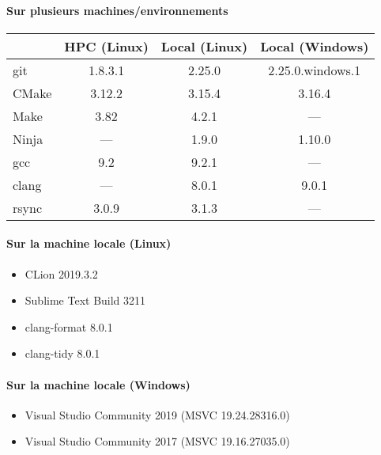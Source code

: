 \documentclass[a4paper,11pt,twoside,french,report]{../common/simplem}
\begin{document}
			\paragraph*{Sur plusieurs machines/environnements}
				\begin{center}
					\begin{tabular}{lccc}
						& HPC (Linux) & Local (Linux) & Local (Windows)\\
						\midrule
						git & 1.8.3.1 & 2.25.0 & 2.25.0.windows.1\\
						CMake & 3.12.2 & 3.15.4 & 3.16.4\\
						Make & 3.82 & 4.2.1 & ---\\
						Ninja & --- & 1.9.0 & 1.10.0\\
						gcc & 9.2 & 9.2.1 & ---\\
						clang & --- & 8.0.1 & 9.0.1\\
						rsync & 3.0.9 & 3.1.3 & ---\\
					\end{tabular}
				\end{center}
			\paragraph*{Sur la machine locale (Linux)}
				\begin{itemize}
					\item CLion 2019.3.2
					\item Sublime Text Build 3211
					\item clang-format 8.0.1
					\item clang-tidy 8.0.1
				\end{itemize}
			\paragraph*{Sur la machine locale (Windows)}
				\begin{itemize}
					\item Visual Studio Community 2019 (MSVC 19.24.28316.0)
					\item Visual Studio Community 2017 (MSVC 19.16.27035.0)
				\end{itemize}
\end{document}
